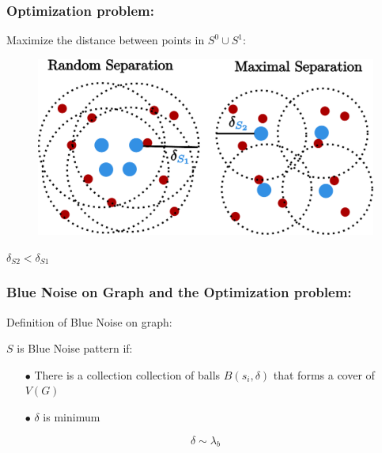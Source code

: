 \documentclass[11pts]{beamer}
\begin{document}
\begin{frame}%
\frametitle{Optimization problem:}
Maximize the distance between points in $S^{0}\cup S^{1}$:
\begin{figure}
    \centering
    \includegraphics[scale=0.4]{IM/SEPARATION.pdf}

\end{figure}
\centering
$\delta_{S2}<\delta_{S1}$
\end{frame}


\begin{frame}%
\frametitle{Blue Noise on Graph and the Optimization problem:}
Definition of Blue Noise on graph:
\begin{definition}
$S$ is Blue Noise pattern if:

\begin{enumerate}
    \item[$\bullet$] There is a collection collection of  balls $B(s_{i},\delta)$ that forms a cover of $V(G)$
    \item[$\bullet$]  $\delta$ is  minimum 
\end{enumerate}
\end{definition}

\begin{huge}
\begin{equation*}
    \delta \sim \lambda_{b}
\end{equation*}
\end{huge}

\end{frame}
\end{document}

